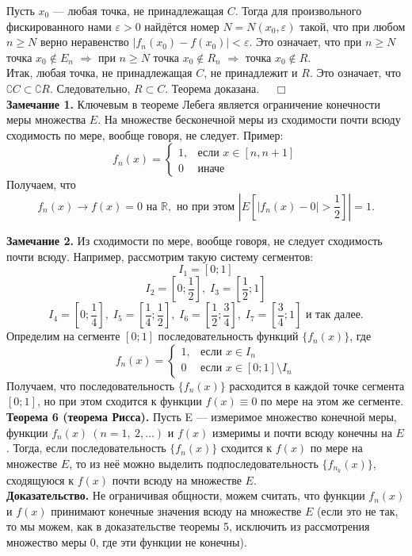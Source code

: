 \documentclass[12pt,a4paper, titlepage]{article}
\begin{document}
Пусть $x_0$ --- любая точка, не принадлежащая $C$. Тогда для произвольного фискированного нами $\varepsilon > 0$ найдётся номер $N = N(x_0, \varepsilon)$ такой, что при любом $n \geqslant N$ верно неравенство $|f_n(x_0)-f(x_0)| < \varepsilon$. Это означает, что при $n \geqslant N$ точка $x_0 \notin E_n$ $\Rightarrow$ при $n \geqslant N$ точка $x_0 \notin R_n$ $\Rightarrow$ точка $x_0 \notin R$.\\

Итак, любая точка, не принадлежащая $C$, не принадлежит и $R$. Это означает, что $\complement C \subset \complement R$. Следовательно, $R \subset C$. Теорема доказана. $\quad \Box$\\

\textbf{Замечание 1.} Ключевым в теореме Лебега является ограничение конечности меры множества $E$. На множестве бесконечной меры из сходимости почти всюду сходимость по мере, вообще говоря, не следует. Пример:
$$
f_n(x)=\begin{cases}
1, &\text{если $x \in [n, n+1]$}\\
0 &\text{иначе}
\end{cases}
$$
Получаем, что
$$
f_n(x) \to f(x) = 0 \mbox{ на } \mathbb{R}, \mbox{ но при этом } |E[|f_n(x) - 0| > \frac 1 2 ]| = 1.
$$

\textbf{Замечание 2.} Из сходимости по мере, вообще говоря, не следует сходимость почти всюду. Например, рассмотрим такую систему сегментов:
$$
I_1 = [0; 1]
$$
$$
I_2 = \left[0; \frac12\right], \; I_3 = \left[\frac12; 1\right] 
$$
$$
I_4 = \left[0; \frac14\right], \; I_5 = \left[\frac14; \frac12\right], \;
I_6 = \left[\frac12; \frac34\right], \; I_7 = \left[\frac34; 1\right] \mbox{ и так далее.}
$$
Определим на сегменте $[0; 1]$ последовательность функций $\lbrace f_n(x) \rbrace$, где
$$
f_n(x)=\begin{cases}
1, &\text{если $x \in I_n$}\\
0 &\text{если $x \in [0; 1] \setminus I_n$}
\end{cases}
$$
Получаем, что последовательность $\lbrace f_n(x) \rbrace$ расходится в каждой точке сегмента $[0; 1]$, но при этом сходится к функции $f(x) \equiv 0$ по мере на этом же сегменте.\\

\textbf{Теорема 6 (теорема Рисса).} Пусть E --- измеримое множество конечной меры, функции $f_n(x) \ (n = 1,\ 2,\dots)$ и $f(x)$ измеримы и почти всюду конечны на $E$. Тогда, если последовательность $\lbrace f_n(x) \rbrace$ сходится к $f(x)$ по мере на множестве $E$, то из неё можно выделить подпоследовательность $\lbrace f_{n_k}(x) \rbrace$, сходящуюся к $f(x)$ почти всюду на множестве $E$.\\
\textbf{Доказательство.}
Не ограничивая общности, можем считать, что функции $f_n(x)$ и $f(x)$ принимают конечные значения всюду на множестве $E$ (если это не так, то мы можем, как в доказательстве теоремы 5, исключить из рассмотрения множество меры 0, где эти функции не конечны).\\
\end{document}
